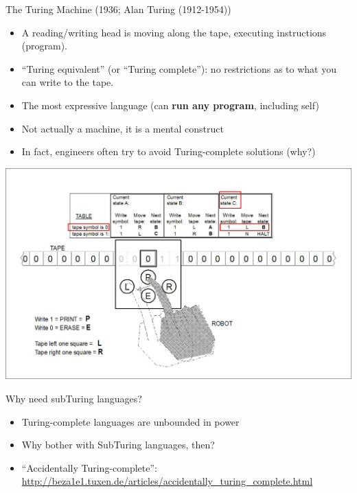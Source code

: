 \documentclass{beamer}
\begin{document}
\begin{frame}{The Turing Machine (1936; Alan Turing (1912-1954))}
\begin{small}
\begin{itemize}
\item A reading/writing head is moving along the tape, executing instructions (program).
\item \small ``Turing equivalent'' (or ``Turing complete''): no restrictions as to what you can write to the tape.
\item The most expressive language (can {\bf run any program}, including self)
\item Not actually a machine, it is a mental construct
\item In fact, engineers often try to avoid Turing-complete solutions (why?)
\end{itemize}
\end{small}
\includegraphics[height=0.3\textheight]{figures/turing}
\end{frame}

\begin{frame}{Why need subTuring languages?}
\begin{itemize}
\item Turing-complete languages are unbounded in power
\item Why bother with SubTuring languages, then?
\item ``Accidentally Turing-complete'': \url{http://beza1e1.tuxen.de/articles/accidentally_turing_complete.html}
\end{itemize}
\end{frame}
\end{document}
